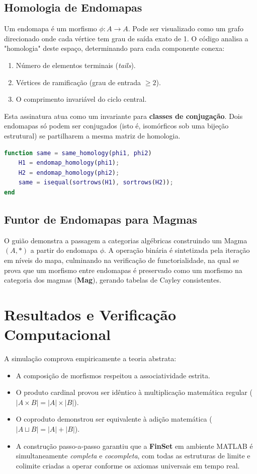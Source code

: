 \subsection{Homologia de Endomapas}
Um endomapa é um morfismo $\phi: A \to A$. Pode ser visualizado como um grafo direcionado onde cada vértice tem grau de saída exato de 1. O código analisa a "homologia" deste espaço, determinando para cada componente conexa:
\begin{enumerate}
    \item Número de elementos terminais (\textit{tails}).
    \item Vértices de ramificação (grau de entrada $\ge 2$).
    \item O comprimento invariável do ciclo central.
\end{enumerate}
Esta assinatura atua como um invariante para \textbf{classes de conjugação}. Dois endomapas só podem ser conjugados (isto é, isomórficos sob uma bijeção estrutural) se partilharem a mesma matriz de homologia.

\begin{lstlisting}[language=Matlab, caption={Deteção estrutural de invariantes (Homologia)}]
function same = same_homology(phi1, phi2)
    H1 = endomap_homology(phi1);
    H2 = endomap_homology(phi2);
    same = isequal(sortrows(H1), sortrows(H2));
end
\end{lstlisting}

\subsection{Funtor de Endomapas para Magmas}
O guião demonstra a passagem a categorias algébricas construindo um Magma $(A, *)$ a partir do endomapa $\phi$. A operação binária é sintetizada pela iteração em níveis do mapa, culminando na verificação de functorialidade, na qual se prova que um morfismo entre endomapas é preservado como um morfismo na categoria dos magmas (\textbf{Mag}), gerando tabelas de Cayley consistentes.

\section{Resultados e Verificação Computacional}
A simulação comprova empiricamente a teoria abstrata:
\begin{itemize}
    \item A composição de morfismos respeitou a associatividade estrita.
    \item O produto cardinal provou ser idêntico à multiplicação matemática regular ($|A \times B| = |A| \times |B|$).
    \item O coproduto demonstrou ser equivalente à adição matemática ($|A \sqcup B| = |A| + |B|$).
    \item A construção passo-a-passo garantiu que a \textbf{FinSet} em ambiente MATLAB é simultaneamente \textit{completa} e \textit{cocompleta}, com todas as estruturas de limite e colimite criadas a operar conforme os axiomas universais em tempo real.
\end{itemize}